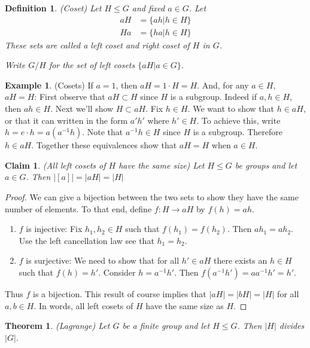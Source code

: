 \documentclass[12pt]{article}
\newtheorem{theorem}{Theorem}
\newtheorem{claim}{Claim}
\newtheorem{definition}{Definition}
\theoremstyle{definition}
\newtheorem{example}{Example}
\theoremstyle{definition}
\begin{document}
\begin{definition}(Coset)
Let $H \leq G$ and fixed $a \in G$. Let
\begin{align*}
aH &= \{ ah | h \in H \} \\
Ha &= \{ ha | h \in H \} 
\end{align*}
These sets are called a left coset and right coset of $H$ in $G$. 

Write $G/H$ for the set of left cosets $\{aH | a \in G \}$.
\end{definition}

\begin{example}(Cosets)
If $a=1$, then $aH = 1 \cdot H = H$. And, for any $a \in H$, $aH = H$: First observe that $aH \subset H$ since $H$ is a subgroup. Indeed if $a,h \in H$, then $ah \in H$. Next we'll show $H \subset aH$. Fix $h \in H$. We want to show that $h \in aH$, or that it can written in the form $a'h'$ where $h' \in H$. To achieve this, write $h = e \cdot h = a (a^{-1} h)$. Note that $a^{-1} h \in H$ since $H$ is a subgroup. Therefore $h \in aH$. Together these equivalences show that $aH = H$ when $a \in H$. 
\end{example}

\begin{claim}(All left cosets of $H$ have the same size) 
Let $H \leq G$ be groups and let $a \in G$. Then $|[a] | = |aH| = |H|$
\end{claim}
\begin{proof}
We can give a bijection between the two sets to show they have the same number of elements. To that end, define $f: H \to aH$ by $f(h) = ah$. 
\begin{enumerate}
	\item $f$ is injective: Fix $h_1, h_2 \in H$ such that $f(h_1) = f(h_2)$. Then $a h_1 = a h_2$. Use the left cancellation law see that $h_1 = h_2$. 
	\item $f$ is surjective: We need to show that for all $h' \in aH$ there exists an $h \in H$ such that $f(h) = h'$. Consider $h = a^{-1} h'$. Then $f(a^{-1} h') = a a^{-1} h' = h'$. 
\end{enumerate}
Thus $f$ is a bijection. This result of course implies that $|aH| = |bH| = |H|$ for all $a, b \in H$. In words, all left cosets of $H$ have the same size as $H$. 
\end{proof}

\begin{theorem}(Lagrange)
	Let $G$ be a finite group and let $H \leq G$. Then $|H|$ divides $|G|$.
\end{theorem}
\end{document}
